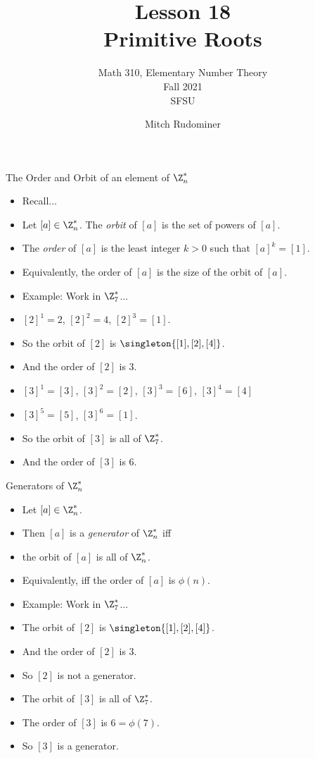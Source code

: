 \documentclass{beamer}
\title{Lesson 18 \\ Primitive Roots}
\subtitle{Math 310, Elementary Number Theory \\ Fall 2021 \\ SFSU}
\author{Mitch Rudominer}
\date{}
\begin{document}
\begin{frame}
  \titlepage
\end{frame}

\begin{frame}{The Order and Orbit of an element of $\Z_n^*$}

\begin{itemize}
  \item Recall...
  \item Let $[a]\in\Z^*_n$. The \emph{orbit} of $[a]$ is
  the set of powers of $[a]$.
  \item The \emph{order} of $[a]$ is
  the least integer $k>0$ such that $[a]^k=[1]$.
  \item Equivalently, the order of $[a]$ is the size of the orbit of $[a]$.
  \item Example: Work in $\Z^*_7$...
  \item $[2]^1 = 2$, $[2]^2 = 4$, $[2]^3=[1]$.
  \item So the orbit of $[2]$ is $\singleton{[1],[2],[4]}$.
  \item And the order of $[2]$ is $3$.
  \item $[3]^1=[3]$, $[3]^2=[2]$, $[3]^3=[6]$, $[3]^4=[4]$
  \item $[3]^5=[5]$, $[3]^6=[1]$.
  \item So the orbit of $[3]$ is all of $\Z^*_7$.
  \item And the order of $[3]$ is $6$.
\end{itemize}

\end{frame}

\begin{frame}{Generators of $\Z_n^*$}

\begin{itemize}
  \item Let $[a]\in\Z^*_n$.
  \item Then $[a]$ is a \emph{generator} of $\Z_n^*$ iff
  \item the orbit of $[a]$ is all of $\Z_n^*$.
  \item Equivalently, iff the order of $[a]$ is $\phi(n)$.
  \item Example: Work in $\Z^*_7$...
  \item The orbit of $[2]$ is $\singleton{[1],[2],[4]}$.
  \item And the order of $[2]$ is $3$.
  \item So $[2]$ is not a generator.
  \item The orbit of $[3]$ is all of $\Z^*_7$.
  \item The order of $[3]$ is $6 = \phi(7)$.
  \item So $[3]$ is a generator.
\end{itemize}

\end{frame}
\end{document}
